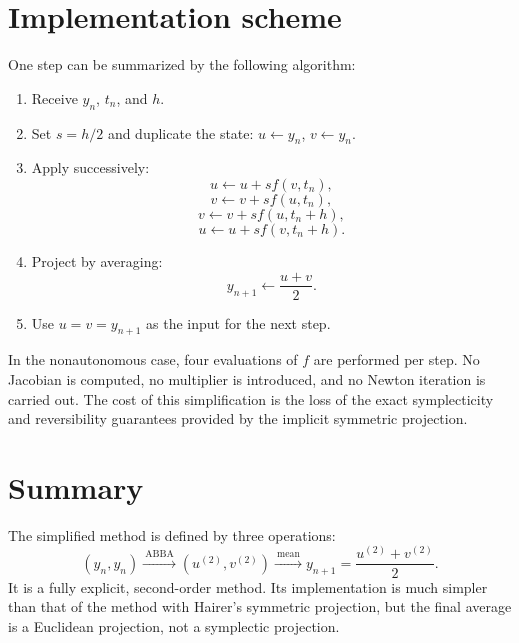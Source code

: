 \documentclass[11pt,a4paper]{article}
\begin{document}
\section{Implementation scheme}

One step can be summarized by the following algorithm:
\begin{enumerate}
 \item Receive \(y_n\), \(t_n\), and \(h\).
 \item Set \(s=h/2\) and duplicate the state:
       \(u\leftarrow y_n\), \(v\leftarrow y_n\).
 \item Apply successively:
       \[
       u\leftarrow u+s f(v,t_n),
       \]
       \[
       v\leftarrow v+s f(u,t_n),
       \]
       \[
       v\leftarrow v+s f(u,t_n+h),
       \]
       \[
       u\leftarrow u+s f(v,t_n+h).
       \]
 \item Project by averaging:
       \[
       y_{n+1}\leftarrow\frac{u+v}{2}.
       \]
 \item Use \(u=v=y_{n+1}\) as the input for the next step.
\end{enumerate}

In the nonautonomous case, four evaluations of \(f\) are performed per step. No Jacobian
is computed, no multiplier is introduced, and no Newton iteration is carried out. The
cost of this simplification is the loss of the exact symplecticity and reversibility
guarantees provided by the implicit symmetric projection.

\section{Summary}

The simplified method is defined by three operations:
\[
 \boxed{
 (y_n,y_n)
 \xrightarrow{\ \mathrm{ABBA}\ }
 (u^{(2)},v^{(2)})
 \xrightarrow{\ \mathrm{mean}\ }
 y_{n+1}=\frac{u^{(2)}+v^{(2)}}{2}.
 }
\]
It is a fully explicit, second-order method. Its implementation is much simpler than that
of the method with Hairer's symmetric projection, but the final average is a Euclidean
projection, not a symplectic projection.
\end{document}

